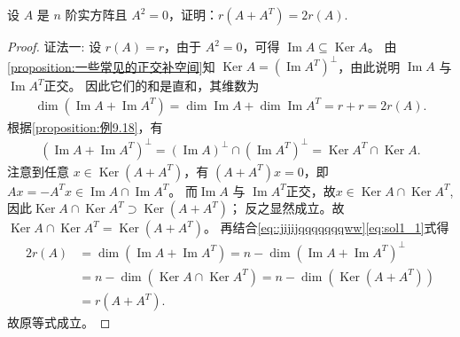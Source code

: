 \documentclass[../../main.tex]{subfiles}%
\begin{document}
\begin{example}
设 \(A\) 是 \(n\) 阶实方阵且 \(A^2=0\)，证明：\(r(A+A^T)=2r(A)\).
\end{example}
\begin{proof}

{\color{blue}证法一:}
设 \(r(A)=r\)，由于 \(A^2=0\)，可得 \(\operatorname{Im}A \subseteq \operatorname{Ker}A\)。
由\cref{proposition:一些常见的正交补空间}知 \(\operatorname{Ker}A = (\operatorname{Im}A^T)^\perp\)，由此说明 \(\operatorname{Im}A\) 与 \(\operatorname{Im}A^T\)正交。
因此它们的和是直和，其维数为
\begin{align}\label{eq::jijijqqqqqqqww}
\dim(\operatorname{Im}A + \operatorname{Im}A^T) = \dim\operatorname{Im}A + \dim\operatorname{Im}A^T = r + r = 2r(A).
\end{align}
根据\cref{proposition:例9.18}，有
\begin{align}\label{eq:sol1_1} 
(\operatorname{Im}A + \operatorname{Im}A^T)^\perp = (\operatorname{Im}A)^\perp \cap (\operatorname{Im}A^T)^\perp 
= \operatorname{Ker}A^T \cap \operatorname{Ker}A. 
\end{align}
注意到任意 \(x \in \operatorname{Ker}(A+A^T)\)，有 \((A+A^T)x = 0\)，即 \(Ax = -A^Tx\in \operatorname{Im}A\cap \operatorname{Im}A^T\)。
而\(\operatorname{Im}A\) 与 \(\operatorname{Im}A^T\)正交，故\(x \in \operatorname{Ker}A \cap \operatorname{Ker}A^T\),因此\(\operatorname{Ker}A \cap \operatorname{Ker}A^T \supset \operatorname{Ker}(A+A^T)\)；
反之显然成立。故 \(\operatorname{Ker}A \cap \operatorname{Ker}A^T = \operatorname{Ker}(A+A^T)\)。
再结合\eqref{eq::jijijqqqqqqqww}\eqref{eq:sol1_1}式得
\begin{align*}
2r(A) &= \dim(\operatorname{Im}A + \operatorname{Im}A^T) = n - \dim(\operatorname{Im}A + \operatorname{Im}A^T)^\perp \\
&= n - \dim(\operatorname{Ker}A \cap \operatorname{Ker}A^T) = n - \dim(\operatorname{Ker}(A + A^T)) \\
&= r(A + A^T).
\end{align*}
故原等式成立。


\end{proof}
\end{document}
